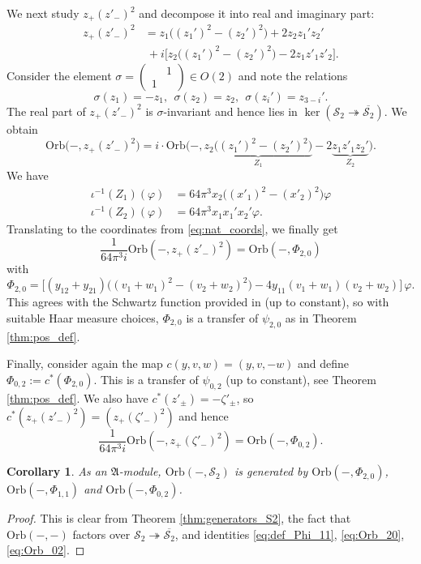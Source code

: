 \documentclass[reqno, 11pt]{amsart} %
\numberwithin{equation}{section}
\theoremstyle{plain}
\newtheorem{corollary}[theorem]{Corollary}
\theoremstyle{definition}
\theoremstyle{remark}
\newcommand{\ov}{\overline}
\newcommand{\mcS}{\mathcal{S}}
\newcommand{\mfA}{\mathfrak{A}}
\newcommand{\Orb}{\mathrm{Orb}}
\begin{document}
We next study $z_+(z'_-)^2$ and decompose it into real and imaginary part:
$$
\begin{aligned}
z_+(z'_-)^2 & = z_1\big((z_1')^2 - (z_2')^2\big) + 2 z_2 z_1' z_2'\\
& \ + i\big[z_2 \big((z_1')^2 - (z_2')^2\big) - 2z_1z'_1z'_2\big].
\end{aligned}
$$
Consider the element $σ = \left(\begin{smallmatrix} & 1 \\ 1 & \end{smallmatrix}\right)\in O(2)$ and note the relations
$$σ(z_1) = -z_1,\ \ σ(z_2) = z_2,\ \ σ(z_i') = z_{3-i}'.$$
The real part of $z_+(z'_-)^2$ is $σ$-invariant and hence lies in $\ker(\mcS_2\twoheadrightarrow \ov{\mcS_2})$. We obtain
\begin{equation*}
\Orb\big(-,z_+(z'_-)^2\big) = i\cdot \Orb\big(-,\underset{Z_1}{\underbrace{z_2\big((z_1')^2 - (z_2')^2\big)}} - 2 \underset{Z_2}{\underbrace{z_1z'_1z_2'}}\big).
\end{equation*}
We have
$$\begin{aligned}
ι^{-1}(Z_1)(φ) & = 64π^3 x_2\big((x'_1)^2 - (x'_2)^2\big)φ\\
ι^{-1}(Z_2)(φ) & = 64π^3 x_1x_1'x_2' φ.
\end{aligned}$$
Translating to the coordinates from \eqref{eq:nat_coords}, we finally get
\begin{equation}\label{eq:Orb_20}
\frac{1}{64π^3i} \Orb(-, z_+(z'_-)^2) = \Orb(-,Φ_{2,0})
\end{equation}
with
\begin{equation}\label{eq:Phi_KM}
Φ_{2,0} = \big[(y_{12}+y_{21})\big((v_1 + w_1)^2 - (v_2 + w_2)^2\big) - 4 y_{11} (v_1 + w_1)(v_2+w_2)\big]\,φ.
\end{equation}
This agrees with the Schwartz function provided in \cite[Example 4.17]{MSY} (up to constant), so with suitable Haar measure choices, $Φ_{2,0}$ is a transfer of $ψ_{2,0}$ as in Theorem \ref{thm:pos_def}.

Finally, consider again the map $c(y,v,w) = (y, v, -w)$ and define $Φ_{0,2} := c^*(Φ_{2,0})$. This is a transfer of $ψ_{0,2}$ (up to constant), see Theorem \ref{thm:pos_def}. We also have $c^*(z'_\pm) = - ζ'_\pm$, so $c^*(z_+(z'_-)^2) = (z_+(ζ'_-)^2)$ and hence
\begin{equation}\label{eq:Orb_02}
\frac{1}{64 π^3i}\Orb(-, z_+(ζ'_-)^2) = \Orb(-,Φ_{0,2}).
\end{equation}

\begin{corollary}\label{cor:main_S_2}
As an $\mfA$-module, $\Orb(-, \mcS_2)$ is generated by $\Orb(-,Φ_{2,0})$, $\Orb(-,Φ_{1,1})$ and $\Orb(-,Φ_{0,2})$.
\end{corollary}
\begin{proof}
This is clear from Theorem \ref{thm:generators_S2}, the fact that $\Orb(-,-)$ factors over $\mcS_2\twoheadrightarrow \ov{\mcS_2}$, and identities \eqref{eq:def_Phi_11}, \eqref{eq:Orb_20}, \eqref{eq:Orb_02}.
\end{proof}
\end{document}
